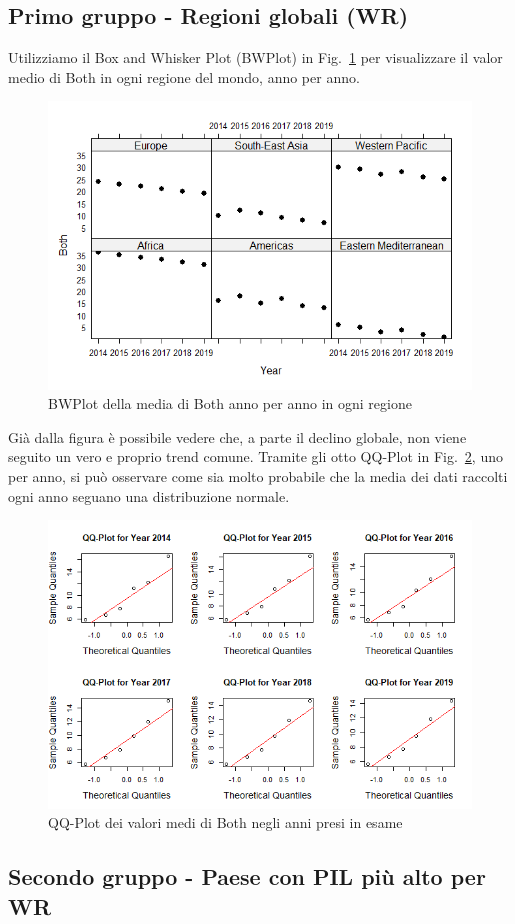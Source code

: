 \documentclass[conference]{IEEEtran}
\begin{document}
\subsection{Primo gruppo - Regioni globali (WR)}
Utilizziamo il Box and Whisker Plot (BWPlot) in Fig.~\ref{5firstgroup} per visualizzare il
valor medio di Both in ogni regione del mondo, anno per anno.
\begin{figure}[htbp]
    \centerline{\includegraphics[width=.5\textwidth]{img/5 - Firstgroup.png}}
    \caption{BWPlot della media di Both anno per anno in ogni regione}
    \label{5firstgroup}
\end{figure}
Già dalla figura è possibile vedere che, a parte il declino globale, non viene seguito
un vero e proprio trend comune.
Tramite gli otto QQ-Plot in Fig.~\ref{6firstqq}, uno per anno, si può osservare come sia
molto probabile che la media dei dati raccolti ogni anno seguano una distribuzione normale.
\begin{figure}[htbp]
    \centerline{\includegraphics[width=.5\textwidth]{img/6 - Firstqq.png}}
    \caption{QQ-Plot dei valori medi di Both negli anni presi in esame}
    \label{6firstqq}
\end{figure}

\subsection{Secondo gruppo - Paese con PIL più alto per WR}
\end{document}
